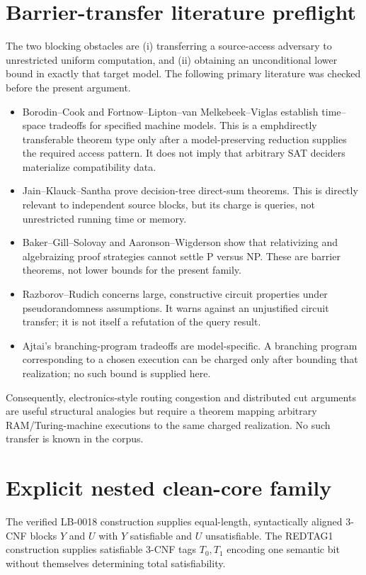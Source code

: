 \documentclass[11pt]{article}
\begin{document}
\section{Barrier-transfer literature preflight}

The two blocking obstacles are (i) transferring a source-access adversary to unrestricted uniform computation, and (ii) obtaining an unconditional lower bound in exactly that target model.  The following primary literature was checked before the present argument.

\begin{itemize}
\item Borodin--Cook and Fortnow--Lipton--van Melkebeek--Viglas establish time--space tradeoffs for specified machine models.  This is a emph{directly transferable theorem type} only after a model-preserving reduction supplies the required access pattern.  It does not imply that arbitrary SAT deciders materialize compatibility data.
\item Jain--Klauck--Santha prove decision-tree direct-sum theorems.  This is directly relevant to independent source blocks, but its charge is queries, not unrestricted running time or memory.
\item Baker--Gill--Solovay and Aaronson--Wigderson show that relativizing and algebraizing proof strategies cannot settle P versus NP.  These are barrier theorems, not lower bounds for the present family.
\item Razborov--Rudich concerns large, constructive circuit properties under pseudorandomness assumptions.  It warns against an unjustified circuit transfer; it is not itself a refutation of the query result.
\item Ajtai's branching-program tradeoffs are model-specific.  A branching program corresponding to a chosen execution can be charged only after bounding that realization; no such bound is supplied here.
\end{itemize}

Consequently, electronics-style routing congestion and distributed cut arguments are useful structural analogies but require a theorem mapping arbitrary RAM/Turing-machine executions to the same charged realization.  No such transfer is known in the corpus.

\section{Explicit nested clean-core family}

The verified LB-0018 construction supplies equal-length, syntactically aligned 3-CNF blocks $Y$ and $U$ with $Y$ satisfiable and $U$ unsatisfiable.  The REDTAG1 construction supplies satisfiable 3-CNF tags $T_0,T_1$ encoding one semantic bit without themselves determining total satisfiability.
\end{document}
